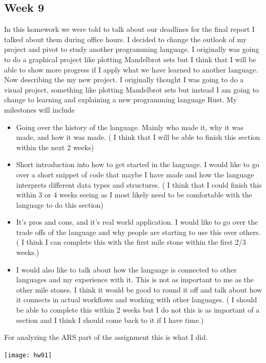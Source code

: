 \documentclass{article}
\theoremstyle{theorem}
\theoremstyle{definition}
\theoremstyle{remark}
\begin{document}
\subsection{Week 9}
  In this homework we were told to talk about our deadlines for the final report I talked about them during office hours.
     I decided to change the outlook of my project and pivot to study another programming language. I originally was going to do a graphical project like plotting Mandelbrot sets but I think that I will be able to show more progress if I apply what we have learned to another language. 
    Now describing the my new project. I originally thought I was going to do a visual project, something like plotting Mandelbrot sets but instead I am going to change to learning and explaining a new programming language Rust. My milestones will include 
    \begin{itemize}

\item Going over the history of the language. Mainly who made it, why it was made, and how it was made. ( I think that I will be able to finish this section within the next 2 weeks) 
\item Short introduction into how to get started in the language. I would like to go over a short snippet of code that maybe I have made and how the language interprets different data types and structures. ( I think that I could finish this within 3 or 4 weeks seeing as I most likely need to be comfortable with the language to do this section)
\item It’s pros and cons, and it's real world application. I would like to go over the trade offs of the language and why people are starting to use this over others. ( I think I can complete this with the first mile stone within the first 2/3 weeks.)
\item I would also like to talk about how the language is connected to other languages and my experience with it. This is not as important to me as the other mile stones. I think it would be good to round it off and talk about how it connects in actual workflows and working with other languages. ( I should be able to complete this within 2 weeks but I do not this is as important of a section and I think I should come back to it if I have time.)
\end{itemize}

For analyzing the ARS part of the assignment this is what I did.
\begin{center}

\texttt{[image: hw91]}
\end{center}
\end{document}
